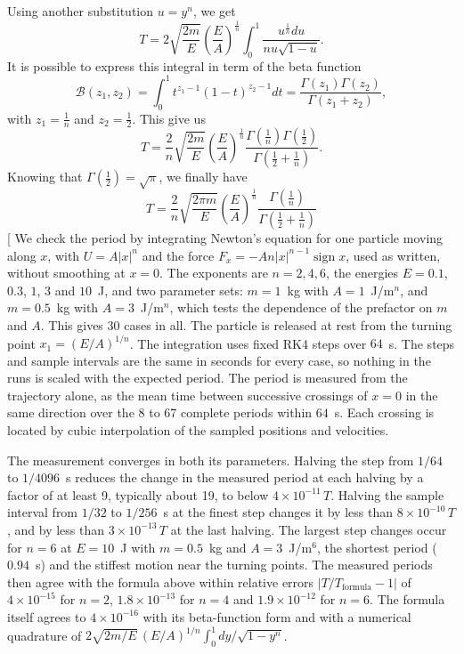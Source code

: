 \begin{subproblem}
{Using another substitution $u = y^n$, we get
\begin{equation*}
    T = 2\sqrt{\frac{2m}{E}} \left(\frac{E}{A}\right)^{\frac{1}{n}} \int_0^1 \frac{u^{\frac{1}{n}}du}{nu\sqrt{1-u}} .
\end{equation*}
It is possible to express this integral in term of the beta function
\begin{equation*}
    \mathcal{B}(z_1,z_2) = \int_0^1  t^{z_1-1}\left( 1 - t \right)^{z_2-1}dt = \frac{\Gamma\left(z_1\right)\Gamma\left(z_2\right)}{\Gamma\left(z_1+z_2\right)},
\end{equation*}
with $z_1 = \frac{1}{n}$ and $z_2 = \frac{1}{2}$. This give us
\begin{equation*}
    T = \frac{2}{n}\sqrt{\frac{2m}{E}} \left(\frac{E}{A}\right)^{\frac{1}{n}} \frac{\Gamma\left(\frac{1}{n}\right)\Gamma\left(\frac{1}{2}\right)}{\Gamma\left(\frac{1}{2}+\frac{1}{n}\right)} .
\end{equation*}
Knowing that $\Gamma\left(\frac{1}{2}\right) = \sqrt{\pi}$, we finally have
}
{
\begin{equation*}
    T = \frac{2}{n}\sqrt{\frac{2\pi m }{E}} \left(\frac{E}{A}\right)^{\frac{1}{n}} \frac{\Gamma\left(\frac{1}{n}\right)}{\Gamma\left(\frac{1}{2}+\frac{1}{n}\right)}
\end{equation*}
}
[
We check the period by integrating Newton's equation for one particle moving along $x$, with $U=A|x|^n$ and the force $F_x=-An|x|^{n-1}\operatorname{sign}x$, used as written, without smoothing at $x=0$. The exponents are $n=2,4,6$, the energies $E=0.1$, $0.3$, $1$, $3$ and $10$~J, and two parameter sets: $m=1$~kg with $A=1$~J/m$^n$, and $m=0.5$~kg with $A=3$~J/m$^n$, which tests the dependence of the prefactor on $m$ and $A$. This gives 30 cases in all. The particle is released at rest from the turning point $x_1=(E/A)^{1/n}$. The integration uses fixed RK4 steps over $64$~s. The steps and sample intervals are the same in seconds for every case, so nothing in the runs is scaled with the expected period. The period is measured from the trajectory alone, as the mean time between successive crossings of $x=0$ in the same direction over the 8 to 67 complete periods within $64$~s. Each crossing is located by cubic interpolation of the sampled positions and velocities.

The measurement converges in both its parameters. Halving the step from $1/64$ to $1/4096$~s reduces the change in the measured period at each halving by a factor of at least 9, typically about 19, to below $4\times10^{-11}\,T$. Halving the sample interval from $1/32$ to $1/256$~s at the finest step changes it by less than $8\times10^{-10}\,T$, and by less than $3\times10^{-13}\,T$ at the last halving. The largest step changes occur for $n=6$ at $E=10$~J with $m=0.5$~kg and $A=3$~J/m$^6$, the shortest period ($0.94$~s) and the stiffest motion near the turning points. The measured periods then agree with the formula above within relative errors $|T/T_{\mathrm{formula}}-1|$ of $4\times10^{-15}$ for $n=2$, $1.8\times10^{-13}$ for $n=4$ and $1.9\times10^{-12}$ for $n=6$. The formula itself agrees to $4\times10^{-16}$ with its beta-function form and with a numerical quadrature of $2\sqrt{2m/E}\,(E/A)^{1/n}\int_0^1 dy/\sqrt{1-y^n}$.


\end{subproblem}

